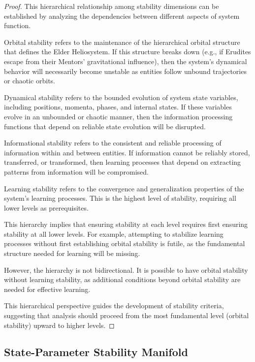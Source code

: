 \begin{proof}
This hierarchical relationship among stability dimensions can be established by analyzing the dependencies between different aspects of system function.

Orbital stability refers to the maintenance of the hierarchical orbital structure that defines the Elder Heliosystem. If this structure breaks down (e.g., if Erudites escape from their Mentors' gravitational influence), then the system's dynamical behavior will necessarily become unstable as entities follow unbound trajectories or chaotic orbits.

Dynamical stability refers to the bounded evolution of system state variables, including positions, momenta, phases, and internal states. If these variables evolve in an unbounded or chaotic manner, then the information processing functions that depend on reliable state evolution will be disrupted.

Informational stability refers to the consistent and reliable processing of information within and between entities. If information cannot be reliably stored, transferred, or transformed, then learning processes that depend on extracting patterns from information will be compromised.

Learning stability refers to the convergence and generalization properties of the system's learning processes. This is the highest level of stability, requiring all lower levels as prerequisites.

This hierarchy implies that ensuring stability at each level requires first ensuring stability at all lower levels. For example, attempting to stabilize learning processes without first establishing orbital stability is futile, as the fundamental structure needed for learning will be missing.

However, the hierarchy is not bidirectional. It is possible to have orbital stability without learning stability, as additional conditions beyond orbital stability are needed for effective learning.

This hierarchical perspective guides the development of stability criteria, suggesting that analysis should proceed from the most fundamental level (orbital stability) upward to higher levels.
\end{proof}

\subsection{State-Parameter Stability Manifold}

